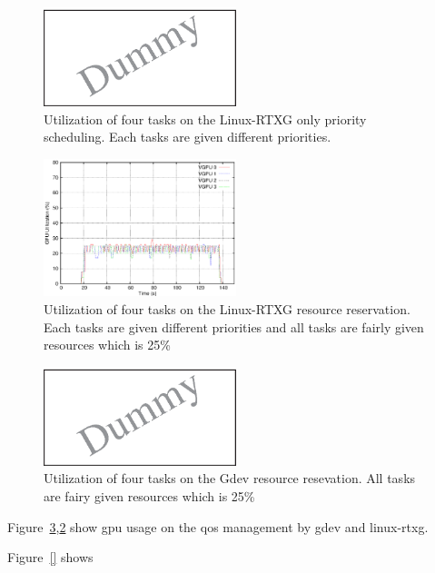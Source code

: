 \begin{figure}[t]
\begin{center}
\includegraphics[width=0.5\textwidth]{img/dummy}
\caption{Utilization of four tasks on the Linux-RTXG only priority scheduling. Each tasks are given different priorities.}
\end{center}
\label{fig:rtx_prio}
\end{figure}

\begin{figure}[t]
\begin{center}
\includegraphics[width=0.5\textwidth]{img/rtx_qos.eps}
\caption{Utilization of four tasks on the Linux-RTXG resource reservation. Each tasks are given different priorities and all tasks are fairly given resources which is 25\%}
\end{center}
\label{fig:qos_rtx}
\end{figure}

\begin{figure}[t]
\begin{center}
\includegraphics[width=0.5\textwidth]{img/dummy}
\caption{Utilization of four tasks on the Gdev resource resevation. All tasks are fairy given resources which is 25\%}
\end{center}
\label{fig:qos_gdev}
\end{figure}


Figure~\ref{fig:qos_gdev},\ref{fig:qos_rtx} show gpu usage on the qos management by gdev and linux-rtxg.



Figure~\ref{} shows 
